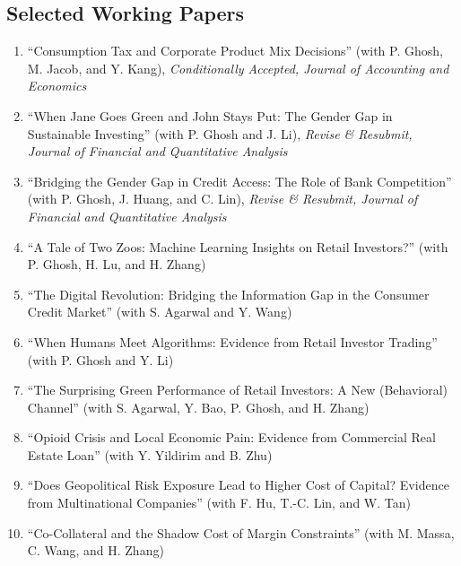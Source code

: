 \documentclass[margin,line]{res}
\begin{document}
\begin{resume}
\section{\sc Selected Working Papers}
\begin{enumerate}

\item 	``Consumption Tax and Corporate Product Mix Decisions'' (with P. Ghosh, M. Jacob, and Y. Kang), \textit{Conditionally Accepted, Journal of Accounting and Economics}
\vspace*{0.2cm}
\item 	``When Jane Goes Green and John Stays Put: The Gender Gap in Sustainable Investing'' (with P. Ghosh and J. Li), \textit{Revise \& Resubmit, Journal of Financial and Quantitative Analysis}
\vspace*{0.2cm} 
\item %
``Bridging the Gender Gap in Credit Access: The Role of Bank Competition'' (with P. Ghosh, J. Huang, and C. Lin), \textit{Revise \& Resubmit, Journal of Financial and Quantitative Analysis}
\vspace*{0.2cm}
\item ``A Tale of Two Zoos: Machine Learning Insights on Retail Investors?'' (with P. Ghosh, H. Lu, and H. Zhang)
\vspace*{0.2cm}
\item %
``The Digital Revolution: Bridging the Information Gap in the Consumer Credit Market'' (with S. Agarwal and Y. Wang)
\vspace*{0.2cm}
\item %
``When Humans Meet Algorithms: Evidence from Retail Investor Trading'' (with P. Ghosh and Y. Li)
\vspace*{0.2cm}
\item %
``The Surprising Green Performance of Retail Investors: A New (Behavioral) Channel'' (with S. Agarwal, Y. Bao, P. Ghosh, and H. Zhang)
\vspace*{0.2cm}
\item ``Opioid Crisis and Local Economic Pain: Evidence from Commercial Real Estate Loan'' (with Y. Yildirim and B. Zhu)
\vspace*{0.2cm}
\item %
``Does Geopolitical Risk Exposure Lead to Higher Cost of Capital? Evidence from Multinational Companies'' (with F. Hu, T.-C. Lin, and W. Tan)
\vspace*{0.2cm}
\item %
``Co-Collateral and the Shadow Cost of Margin Constraints'' (with M. Massa, C. Wang, and H. Zhang)
\vspace*{0.2cm}


\end{enumerate}
\end{resume}
\end{document}
